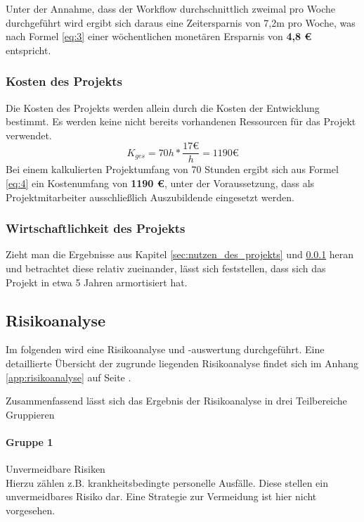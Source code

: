 \documentclass[12pt, xcolor=dvipsnames]{scrartcl}
\begin{document}
Unter der Annahme, dass der Workflow durchschnittlich zweimal pro Woche durchgeführt wird ergibt sich daraus eine Zeitersparnis von 7,2m pro Woche, was nach Formel \ref{eq:3} einer wöchentlichen monetären Ersparnis von \textbf{4,8 \euro{}} entspricht.


\subsubsection{Kosten des Projekts}
\label{sec:kosten_des_projekts}

Die Kosten des Projekts werden allein durch die Kosten der Entwicklung bestimmt. Es werden keine nicht bereits vorhandenen Ressourcen für das Projekt verwendet.
\begin{equation} \label{eq:4}
	K_{ges} = 70h * \frac{17 \euro}{h} = 1190 \euro
\end{equation}
Bei einem kalkulierten Projektumfang von 70 Stunden ergibt sich aus Formel \ref{eq:4} ein Kostenumfang von \textbf{1190 \euro{}}, unter der Voraussetzung, dass als Projektmitarbeiter ausschließlich Auszubildende eingesetzt werden.


\subsubsection{Wirtschaftlichkeit des Projekts}
Zieht man die Ergebnisse aus Kapitel \ref{sec:nutzen_des_projekts} und \ref{sec:kosten_des_projekts} heran und betrachtet diese relativ zueinander, lässt sich feststellen, dass sich das Projekt in etwa 5 Jahren armortisiert hat.


\subsection{Risikoanalyse}

Im folgenden wird eine Risikoanalyse und -auswertung durchgeführt.
Eine detaillierte Übersicht der zugrunde liegenden Risikoanalyse findet sich im Anhang \ref{app:risikoanalyse} auf Seite \pageref{app:risikoanalyse}.

Zusammenfassend lässt sich das Ergebnis der Risikoanalyse in drei Teilbereiche Gruppieren

\paragraph{Gruppe 1}
Unvermeidbare Risiken \\
Hierzu zählen z.B. krankheitsbedingte personelle Ausfälle. Diese stellen ein unvermeidbares Risiko dar. Eine Strategie zur Vermeidung ist hier nicht vorgesehen.\\
\end{document}

